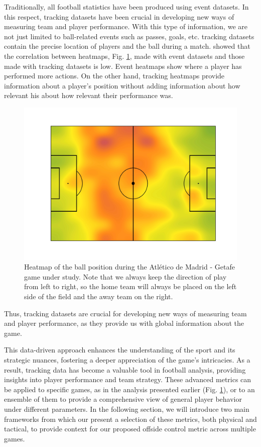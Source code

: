 \documentclass[
  twoside,nohyper]{book}
\begin{document}
Traditionally, all football statistics have been produced using event datasets. In this respect, tracking datasets have been crucial in developing new ways of measuring team and player performance. With this type of information, we are not just limited to ball-related events such as passes, goals, etc. tracking datasets contain the precise location of players and the ball during a match. \citep{GARRIDO2022112827} showed that the correlation between heatmaps, Fig. \ref{fig:heatmap}, made with event datasets and those made with tracking datasets is low. Event heatmaps show where a player has performed more actions. On the other hand, tracking heatmaps provide information about a player's position without adding information about how relevant his about how relevant their performance was.

\begin{figure}[H]

{\centering \includegraphics[width=0.8\linewidth,]{imagenes/Heatmap} 

}

\caption{Heatmap of the ball position during the Atlético de Madrid - Getafe game under study. Note that we always keep the direction of play from left to right, so the home team will always be placed on the left side of the field and the away team on the right.}\label{fig:heatmap}
\end{figure}

Thus, tracking datasets are crucial for developing new ways of measuring team and player performance, as they provide us with global information about the game.

This data-driven approach enhances the understanding of the sport and its strategic nuances, fostering a deeper appreciation of the game's intricacies. As a result, tracking data has become a valuable tool in football analysis, providing insights into player performance and team strategy. These advanced metrics can be applied to specific games, as in the analysis presented earlier (Fig. \ref{fig:heatmap}), or to an ensemble of them to provide a comprehensive view of general player behavior under different parameters. In the following section, we will introduce two main frameworks from which our present a selection of these metrics, both physical and tactical, to provide context for our proposed offside control metric across multiple games.
\end{document}
